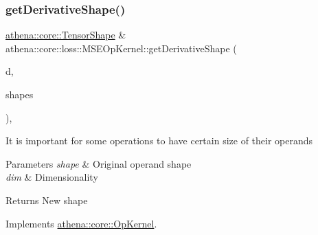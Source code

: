 \mbox{\label{classathena_1_1core_1_1loss_1_1_m_s_e_op_kernel_a68a0220e3a3591638c7725b5cb659609}} 
\subsubsection{\texorpdfstring{get\+Derivative\+Shape()}{getDerivativeShape()}}
{\footnotesize\ttfamily \mbox{\hyperlink{classathena_1_1core_1_1_tensor_shape}{athena\+::core\+::\+Tensor\+Shape}} \& athena\+::core\+::loss\+::\+M\+S\+E\+Op\+Kernel\+::get\+Derivative\+Shape (\begin{DoxyParamCaption}\item[{int}]{d,  }\item[{std\+::vector$<$ \mbox{\hyperlink{classathena_1_1core_1_1_tensor_shape}{athena\+::core\+::\+Tensor\+Shape}} $>$ \&}]{shapes }\end{DoxyParamCaption})\hspace{0.3cm}{\ttfamily [override]}, {\ttfamily [virtual]}}

It is important for some operations to have certain size of their operands 
\begin{DoxyParams}{Parameters}
{\em shape} & Original operand shape \\
\hline
{\em dim} & Dimensionality \\
\hline
\end{DoxyParams}
\begin{DoxyReturn}{Returns}
New shape 
\end{DoxyReturn}


Implements \mbox{\hyperlink{classathena_1_1core_1_1_op_kernel_ad95af6dd184ce7ee9182ec7ca54b6c4d}{athena\+::core\+::\+Op\+Kernel}}.

\mbox{\label{classathena_1_1core_1_1loss_1_1_m_s_e_op_kernel_ab851ee62ea95c3aab8aab2d28cfa9d04}} 

